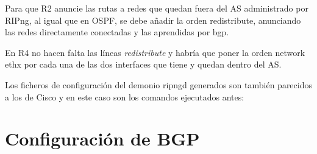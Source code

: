 \documentclass{article}
\begin{document}
Para que R2 anuncie las rutas a redes que quedan fuera del AS administrado por RIPng, al igual que en OSPF, se debe añadir la orden redistribute, anunciando las redes directamente conectadas y las aprendidas por bgp.

En R4 no hacen falta las líneas \textit{redistribute} y habría que poner la orden network ethx por cada una de las dos interfaces que tiene y quedan dentro del AS.

Los ficheros de configuración del demonio ripngd generados son también parecidos a los de Cisco y en este caso son los comandos ejecutados antes:


\section{Configuración de BGP}

%
\end{document}
